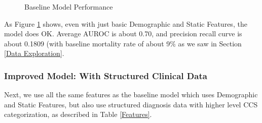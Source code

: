 \documentclass[12pt, final]{article}
\begin{document}
\begin{figure}[H]
\centering     %
{}
\caption{Baseline Model Performance}
\label{BaselineModelPerformance}
\end{figure}

As Figure \ref{BaselineModelPerformance} shows, even with just basic Demographic and Static Features, the model does OK. Average AUROC is about 0.70, and precision recall curve is about 0.1809 (with baseline mortality rate of about 9\% as we saw in Section \ref{Data Exploration}.

\subsubsection{Improved Model: With Structured Clinical Data}
Next, we use all the same features as the baseline model which uses Demographic and Static Features, but also use structured diagnosis data with higher level CCS categorization, as described in Table \ref{Features}.
\end{document}
